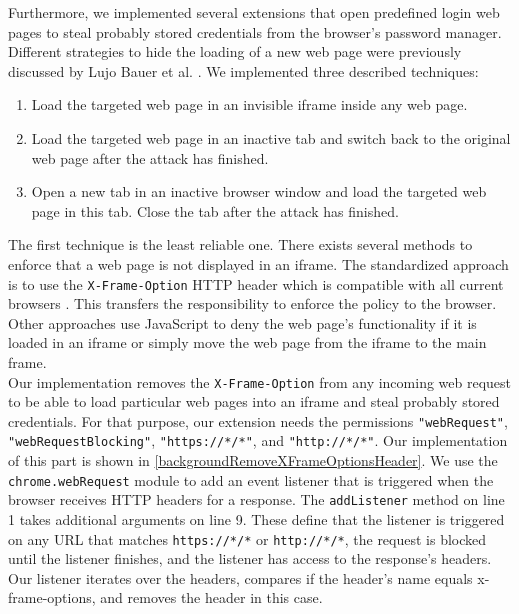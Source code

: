 		
			Furthermore, we implemented several extensions that open predefined login web pages to steal probably stored credentials from the browser's password manager. Different strategies to hide the loading of a new web page were previously discussed by Lujo Bauer et al. \cite{extensions:cns14}. We implemented three described techniques:

			\begin{enumerate}
				\itemsep-0.3em
				\item Load the targeted web page in an invisible iframe inside any web page.
				\item Load the targeted web page in an inactive tab and switch back to the original web page after the attack has finished.
				\item Open a new tab in an inactive browser window and load the targeted web page in this tab. Close the tab after the attack has finished.
			\end{enumerate} 
			
			The first technique is the least reliable one. There exists several methods to enforce that a web page is not displayed in an iframe. The standardized approach is to use the \texttt{X-Frame-Option} HTTP header which is compatible with all current browsers \cite{xFrameOptionsSpezification, xFrameOptionsCompability}. This transfers the responsibility to enforce the policy to the browser. Other approaches use JavaScript to deny the web page's functionality if it is loaded in an iframe or simply move the web page from the iframe to the main frame. \\
			
			Our implementation removes the \texttt{X-Frame-Option} from any incoming web request to be able to load particular web pages into an iframe and steal probably stored credentials. For that purpose, our extension needs the permissions \texttt{"webRequest"}, \texttt{"webRequestBlocking"}, \texttt{"https://*/*"}, and \texttt{"http://*/*"}. Our implementation of this part is shown in \autoref{backgroundRemoveXFrameOptionsHeader}. We use the \texttt{chrome.webRequest} module to add an event listener that is triggered when the browser receives HTTP headers for a response. The \texttt{addListener} method on line 1 takes additional arguments on line 9. These define that the listener is triggered on any URL that matches \texttt{https://*/*} or \texttt{http://*/*}, the request is blocked until the listener finishes, and the listener has access to the response's headers. Our listener iterates over the headers, compares if the header's name equals x-frame-options, and removes the header in this case. \\
			
